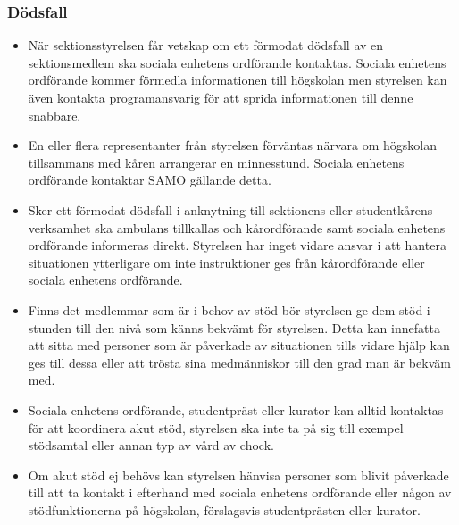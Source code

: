 \subsubsection{Dödsfall}
\begin{itemize}
    \item När sektionsstyrelsen får vetskap om ett förmodat dödsfall av en sektionsmedlem ska sociala  enhetens ordförande kontaktas. Sociala enhetens ordförande kommer förmedla  informationen till högskolan men styrelsen kan även kontakta programansvarig för att sprida  informationen till denne snabbare.
    \item En eller flera representanter från styrelsen förväntas närvara om högskolan tillsammans med kåren arrangerar en minnesstund. Sociala enhetens ordförande kontaktar SAMO gällande detta.
    \item Sker ett förmodat dödsfall i anknytning till sektionens eller studentkårens verksamhet ska ambulans tillkallas och kårordförande samt sociala enhetens ordförande informeras direkt. Styrelsen har inget vidare ansvar i att hantera situationen ytterligare om inte instruktioner ges från  kårordförande eller sociala enhetens ordförande.
    \item Finns det medlemmar som är i behov av stöd bör styrelsen ge dem stöd i stunden till den nivå  som känns bekvämt för styrelsen. Detta kan innefatta att sitta med personer som är  påverkade av situationen tills vidare hjälp kan ges till dessa eller att trösta sina medmänniskor till den grad man är bekväm med.
    \item Sociala enhetens ordförande, studentpräst eller kurator kan alltid kontaktas för att koordinera akut stöd, styrelsen ska inte ta på sig till exempel stödsamtal eller annan typ av vård av chock.
    \item Om akut stöd ej behövs kan styrelsen hänvisa personer som blivit påverkade till att ta kontakt i efterhand med sociala enhetens ordförande eller någon av stödfunktionerna på högskolan, förslagsvis studentprästen eller kurator.  
\end{itemize}